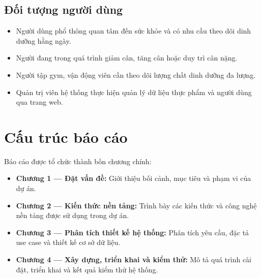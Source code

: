 \subsection{Đối tượng người dùng}

\begin{itemize}
    \item Người dùng phổ thông quan tâm đến sức khỏe và có nhu cầu theo dõi dinh dưỡng hằng ngày.
    \item Người đang trong quá trình giảm cân, tăng cân hoặc duy trì cân nặng.
    \item Người tập gym, vận động viên cần theo dõi lượng chất dinh dưỡng đa lượng.
    \item Quản trị viên hệ thống thực hiện quản lý dữ liệu thực phẩm và người dùng qua trang web.
\end{itemize}

\section{Cấu trúc báo cáo}

Báo cáo được tổ chức thành bốn chương chính:

\begin{itemize}
    \item \textbf{Chương 1 — Đặt vấn đề:} Giới thiệu bối cảnh, mục tiêu và phạm vi của dự án.
    \item \textbf{Chương 2 — Kiến thức nền tảng:} Trình bày các kiến thức và công nghệ nền tảng được sử dụng trong dự án.
    \item \textbf{Chương 3 — Phân tích thiết kế hệ thống:} Phân tích yêu cầu, đặc tả use case và thiết kế cơ sở dữ liệu.
    \item \textbf{Chương 4 — Xây dựng, triển khai và kiểm thử:} Mô tả quá trình cài đặt, triển khai và kết quả kiểm thử hệ thống.
\end{itemize}
